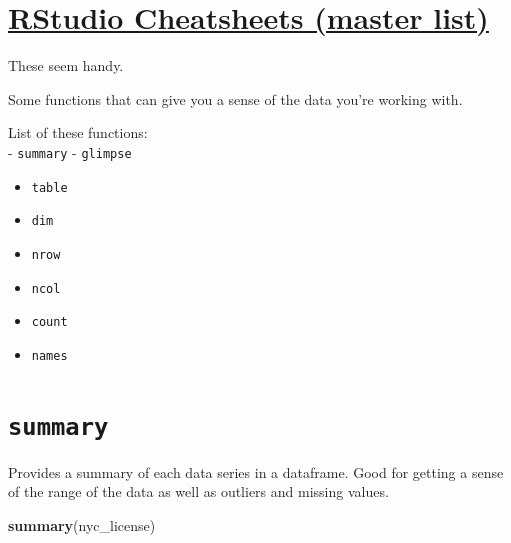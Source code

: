 \documentclass[
]{book}
\newenvironment{Shaded}{\begin{snugshade}}{\end{snugshade}}
\newcommand{\KeywordTok}[1]{\textcolor[rgb]{0.13,0.29,0.53}{\textbf{#1}}}
\newcommand{\NormalTok}[1]{#1}
\providecommand{\tightlist}{%
  \setlength{\itemsep}{0pt}\setlength{\parskip}{0pt}}
\begin{document}
\hypertarget{rstudio-cheatsheets-master-list}{%
\section{\texorpdfstring{\href{https://www.rstudio.com/resources/cheatsheets/}{RStudio Cheatsheets (master list)}}{RStudio Cheatsheets (master list)}}\label{rstudio-cheatsheets-master-list}}

These seem handy.

Some functions that can give you a sense of the data you're working with.

List of these functions:\\
- \texttt{summary}
- \texttt{glimpse}

\begin{itemize}
\tightlist
\item
  \texttt{table}
\item
  \texttt{dim}~\\
\item
  \texttt{nrow}~\\
\item
  \texttt{ncol}~\\
\item
  \texttt{count}~\\
\item
  \texttt{names}
\end{itemize}

\hypertarget{summary}{%
\section{\texorpdfstring{\texttt{summary}}{summary}}\label{summary}}

Provides a summary of each data series in a dataframe. Good for getting a sense of the range of the
data as well as outliers and missing values.

\begin{Shaded}
\begin{Highlighting}[]
\KeywordTok{summary}\NormalTok{(nyc_license)}
\end{Highlighting}
\end{Shaded}
\end{document}
